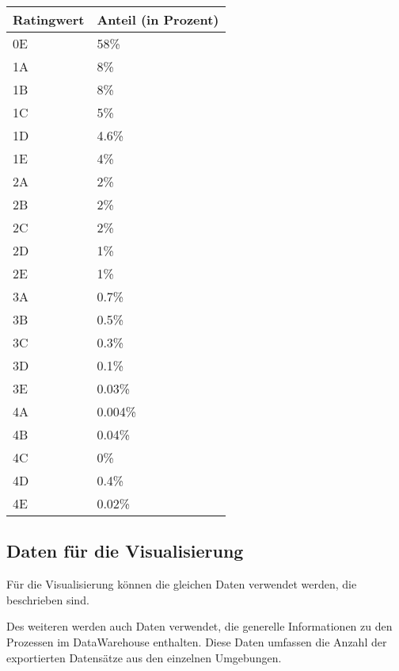 \begin{tabular}[h]{l|l}
Ratingwert & Anteil (in Prozent)   \\ \hline
0E & 58\% \\ \hline
1A & 8\% \\ \hline
1B & 8\% \\ \hline
1C & 5\% \\ \hline
1D & 4.6\% \\ \hline
1E & 4\% \\ \hline
2A & 2\% \\ \hline
2B & 2\% \\ \hline
2C & 2\% \\ \hline
2D & 1\% \\ \hline
2E & 1\% \\ \hline
3A & 0.7\% \\ \hline
3B & 0.5\% \\ \hline
3C & 0.3\% \\ \hline
3D & 0.1\% \\ \hline
3E & 0.03\% \\ \hline
4A & 0.004\% \\ \hline
4B & 0.04\% \\ \hline
4C & 0\% \\ \hline
4D & 0.4\% \\ \hline
4E & 0.02\% \\ 

\end{tabular}




\subsection{Daten für die Visualisierung}
Für die Visualisierung können die gleichen Daten verwendet werden, die beschrieben sind.



Des weiteren werden auch Daten verwendet, die generelle Informationen zu den Prozessen im DataWarehouse enthalten. 
Diese Daten umfassen die Anzahl der exportierten Datensätze aus den einzelnen Umgebungen.





